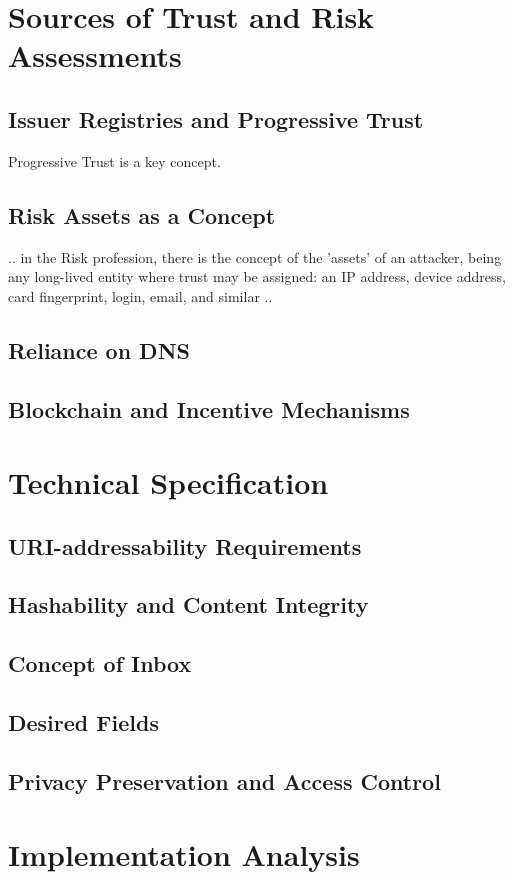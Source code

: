 \documentclass[11pt]{article}
\begin{document}
\section{Sources of Trust and Risk Assessments}
\subsection{Issuer Registries and Progressive Trust}
Progressive Trust is a key concept.
\subsection{Risk Assets as a Concept}
.. in the Risk profession, there is the concept of the 'assets' of an attacker, being any long-lived entity where trust may be assigned: an IP address, device address, card fingerprint, login, email, and similar ..
\subsection{Reliance on DNS}
\subsection{Blockchain and Incentive Mechanisms}

\section{Technical Specification}
\subsection{URI-addressability Requirements}
\subsection{Hashability and Content Integrity}
\subsection{Concept of Inbox}
\subsection{Desired Fields}
\subsection{Privacy Preservation and Access Control}

\section{Implementation Analysis}
\end{document}
